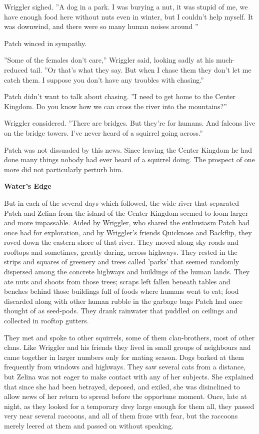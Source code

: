 \documentclass[11pt]{article}
\begin{document}
 Wriggler sighed. ''A dog in a park. I was burying a nut, it was stupid of me, we have enough food here without nuts even in winter, but I couldn't help myself. It was downwind, and there were so many human noises around%
''\par
 Patch winced in sympathy.\par
 ''Some of the females don't care,'' Wriggler said, looking sadly at his much-reduced tail. ''Or that's what they say. But when I chase them they don't let me catch them. I suppose you don't have any troubles with chasing.''\par
 Patch didn't want to talk about chasing. ''I need to get home to the Center Kingdom. Do you know how we can cross the river into the mountains?''\par
 Wriggler considered. ''There are bridges. But they're for humans. And falcons live on the bridge towers. I've never heard of a squirrel going across.''\par
 Patch was not dissuaded by this news. Since leaving the Center Kingdom he had done many things nobody had ever heard of a squirrel doing. The prospect of one more did not particularly perturb him.\par
\par
{\bf Water's Edge\par
}\par
 But in each of the several days which followed, the wide river that separated Patch and Zelina from the island of the Center Kingdom seemed to loom larger and more impassable. Aided by Wriggler, who shared the enthusiasm Patch had once had for exploration, and by Wriggler's friends Quicknose and Backflip, they roved down the eastern shore of that river. They moved along sky-roads and rooftops and sometimes, greatly daring, across highways. They rested in the strips and squares of greenery and trees called 'parks' that seemed randomly dispersed among the concrete highways and buildings of the human lands. They ate nuts and shoots from those trees; scraps left fallen beneath tables and benches behind those buildings full of foods where humans went to eat; food discarded along with other human rubble in the garbage bags Patch had once thought of as seed-pods. They drank rainwater that puddled on ceilings and collected in rooftop gutters.\par
 They met and spoke to other squirrels, some of them clan-brothers, most of other clans. Like Wriggler and his friends they lived in small groups of neighbours and came together in larger numbers only for mating season. Dogs barked at them frequently from windows and highways. They saw several cats from a distance, but Zelina was not eager to make contact with any of her subjects. She explained that since she had been betrayed, deposed, and exiled, she was disinclined to allow news of her return to spread before the opportune moment. Once, late at night, as they looked for a temporary drey large enough for them all, they passed very near several raccoons, and all of them froze with fear, but the raccoons merely leered at them and passed on without speaking.\par
\end{document}
